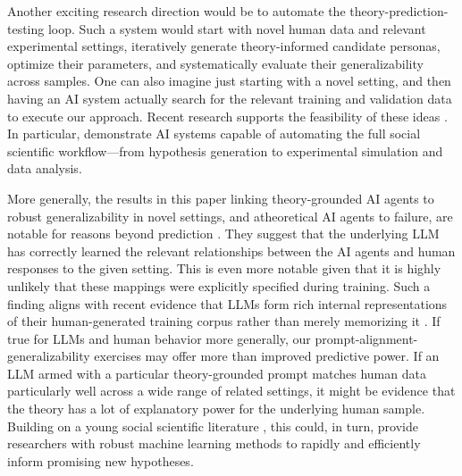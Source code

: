 \documentclass[11pt]{article}
\theoremstyle{definition}
\newcommand{\aisub}{AI agent}
\newcommand{\persona}{prompt}
\begin{document}
Another exciting research direction would be to automate the theory-prediction-testing loop.
Such a system would start with novel human data and relevant experimental settings, iteratively generate theory-informed candidate personas, optimize their parameters, and systematically evaluate their generalizability across samples.
One can also imagine just starting with a novel setting, and then having an AI system actually search for the relevant training and validation data to execute our approach.
Recent research supports the feasibility of these ideas \citep{Jackson2025Mixture,zhu2025ExplPredicting}.
In particular, \cite{Manning2024Automated} demonstrate AI systems capable of automating the full social scientific workflow---from hypothesis generation to experimental simulation and data analysis.

More generally, the results in this paper linking theory-grounded \aisub{s} to robust generalizability in novel settings, and atheoretical \aisub{s} to failure, are notable for reasons beyond prediction \citep{hofman2021integrating}.
They suggest that the underlying LLM has correctly learned the relevant relationships between the \aisub{s} and human responses to the given setting.
This is even more notable given that it is highly unlikely that these mappings were explicitly specified during training.  
Such a finding aligns with recent evidence that LLMs form rich internal representations of their human-generated training corpus rather than merely memorizing it \citep{lindsey2025biology, ameisen2025circuit}.
If true for LLMs and human behavior more generally, our \persona{}-alignment-generalizability exercises may offer more than improved predictive power.
If an LLM armed with a particular theory-grounded \persona{} matches human data particularly well across a wide range of related settings, it might be evidence that the theory has a lot of explanatory power for the underlying human sample.
Building on a young social scientific literature \citep{peterson2021lottery,hirasawa2022using,EnkeComplexity2023,Si2024NovelResearch,MLhypothesis2024,Ashesh2024Anomaly,batista2024words,movva2025sparse}, this could, in turn, provide researchers with robust machine learning methods to rapidly and efficiently inform promising new hypotheses.

\newpage \clearpage




\newpage \clearpage

\appendix
\end{document}
